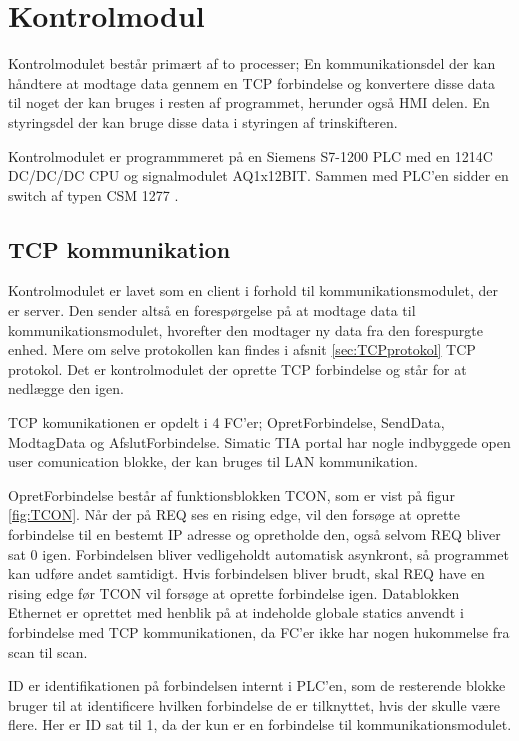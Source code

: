 
\section{Kontrolmodul}
Kontrolmodulet består primært af to processer; En kommunikationsdel der kan håndtere at modtage data gennem en TCP forbindelse og konvertere disse data til noget der kan bruges i resten af programmet, herunder også HMI delen. En styringsdel der kan bruge disse data i styringen af trinskifteren.

Kontrolmodulet er programmmeret på en Siemens S7-1200 PLC med en 1214C DC/DC/DC CPU og signalmodulet AQ1x12BIT. Sammen med PLC'en sidder en switch af typen CSM 1277 .


\subsection{TCP kommunikation}
\label{sec:TCPkommunikation}
Kontrolmodulet er lavet som en client i forhold til kommunikationsmodulet, der er server. Den sender altså en forespørgelse på at modtage data til kommunikationsmodulet, hvorefter den modtager ny data fra den forespurgte enhed. Mere om selve protokollen kan findes i afsnit \ref{sec:TCPprotokol} TCP protokol. Det er kontrolmodulet der oprette TCP forbindelse og står for at nedlægge den igen.

TCP komunikationen er opdelt i 4 FC'er; OpretForbindelse, SendData, ModtagData og AfslutForbindelse. Simatic TIA portal har nogle indbyggede open user comunication  blokke, der kan bruges til LAN kommunikation.

OpretForbindelse består af funktionsblokken TCON, som er vist på figur \ref{fig:TCON}. Når der på REQ ses en rising edge, vil den forsøge at oprette forbindelse til en bestemt IP adresse og opretholde den, også selvom REQ bliver sat 0 igen. Forbindelsen bliver vedligeholdt automatisk asynkront, så programmet kan udføre andet samtidigt. Hvis forbindelsen bliver brudt, skal REQ have en rising edge før TCON vil forsøge at oprette forbindelse igen. Datablokken Ethernet er oprettet med henblik på at indeholde globale statics anvendt i forbindelse med TCP kommunikationen, da FC'er ikke har nogen hukommelse fra scan til scan.

ID er identifikationen på forbindelsen internt i PLC'en, som de resterende blokke bruger til at identificere hvilken forbindelse de er tilknyttet, hvis der skulle være flere. Her er ID sat til 1, da der kun er en forbindelse til kommunikationsmodulet.

